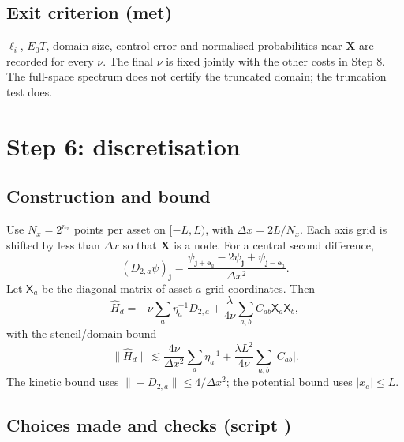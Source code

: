 \documentclass[11pt,a4paper]{article}
\begin{document}
\subsection*{Exit criterion (met)}

$\ell_i$, $E_0T$, domain size, control error and normalised probabilities near
$\mathbf X$ are recorded for every $\nu$. The final $\nu$ is fixed jointly with
the other costs in Step 8. The full-space spectrum does not certify the
truncated domain; the truncation test does.

\section{Step 6: discretisation}
\label{sec:stage6}

\subsection*{Construction and bound}

Use $N_x=2^{n_x}$ points per asset on $[-L,L)$, with $\Delta x=2L/N_x$.
Each axis grid is shifted by less than $\Delta x$ so that $\mathbf X$ is a
node. For a central second difference,
\[
 (D_{2,a}\psi)_{\mathbf j}
 =\frac{\psi_{\mathbf j+\mathbf e_a}-2\psi_{\mathbf j}
 +\psi_{\mathbf j-\mathbf e_a}}{\Delta x^2}.
\]
Let $\mathsf X_a$ be the diagonal matrix of asset-$a$ grid coordinates. Then
\begin{equation}
 \hat H_d=-\nu\sum_a\eta_a^{-1}D_{2,a}
 +\frac{\lambda}{4\nu}\sum_{a,b}C_{ab}\mathsf X_a\mathsf X_b,
 \label{eq:disc-operator}
\end{equation}
with the stencil/domain bound
\begin{equation}
 \|\hat H_d\|\lesssim\frac{4\nu}{\Delta x^2}\sum_a\eta_a^{-1}
 +\frac{\lambda L^2}{4\nu}\sum_{a,b}|C_{ab}|.
 \label{eq:norm-bound}
\end{equation}
The kinetic bound uses $\|-D_{2,a}\|\le4/\Delta x^2$; the potential bound
uses $|x_a|\le L$.

\subsection*{Choices made and checks (script )}
\end{document}
